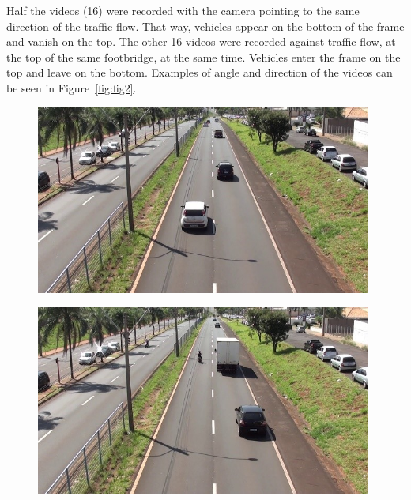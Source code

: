 \documentclass[article,12pt,a4paper,oneside,hidelinks]{memoir}
\begin{document}
Half the videos (16) were recorded with the camera pointing to the same direction of the traffic flow. That way, vehicles appear on the bottom of the frame and vanish on the top. The other 16 videos were recorded against traffic flow, at the top of the same footbridge, at the same time. Vehicles enter the frame on the top and leave on the bottom. Examples of angle and direction of the videos can be seen in Figure~\ref{fig:fig2}.

\begin{figure}[!htbp]
	\begin{minipage}[t]{0.5\textwidth}		
		\centering
		\includegraphics[width=0.985\textwidth]{Figuras/fig2a.jpg}
		\label{fig:sub:subfigure2a}
		\vspace{0.025\textwidth}
	\end{minipage}
	\hspace{\fill}
	\begin{minipage}[t]{0.5\textwidth}
		\centering
		\includegraphics[width=0.985\textwidth]{Figuras/fig2b.jpg}
		\label{fig:sub:subfigure2b}
		\vspace{0.025\textwidth}
	\end{minipage}

\end{figure}
\end{document}
